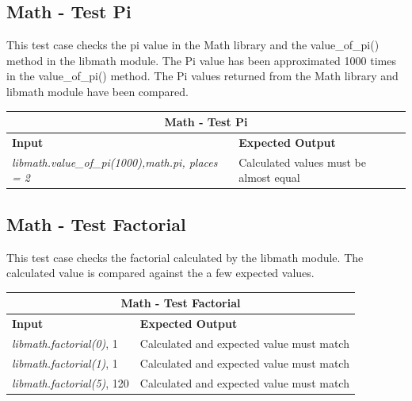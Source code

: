 \subsection{Math - Test Pi}
\vspace*{1em}
\begin{flushleft}
    This test case checks the pi value in the Math library and the value\_of\_pi() method in the libmath module. 
    The Pi value has been approximated 1000 times in the value\_of\_pi() method. 
    The Pi values returned from the Math library and libmath module have been compared.
\vspace*{1em}

\begin{tabular}{ |p{6cm}||p{6cm} |  }
    \hline
    \multicolumn{2}{|c|}{\textbf{Math - Test Pi}} \\
    \hline
    \textbf{Input} & \textbf{Expected Output}\\
    \hline
    \textit{libmath.value\_of\_pi(1000),math.pi, places = 2}   & Calculated values must be almost equal \\
    \hline
\end{tabular}
\end{flushleft}

\vspace*{1em}
\subsection{Math - Test Factorial}
\begin{flushleft}
    This test case checks the factorial calculated by the libmath module. 
    The calculated value is compared against the a few expected values.
\vspace*{1em}

\begin{tabular}{ |p{6cm}||p{6cm} |  }
    \hline
    \multicolumn{2}{|c|}{\textbf{Math - Test Factorial}} \\
    \hline
    \textbf{Input} & \textbf{Expected Output}\\
    \hline
    \textit{libmath.factorial(0)}, 1   & Calculated and expected value must match \\
    \hline
    \textit{libmath.factorial(1)}, 1  & Calculated and expected value must match \\
    \hline
    \textit{libmath.factorial(5)}, 120   & Calculated and expected value must match \\
    \hline
\end{tabular}
\end{flushleft}

